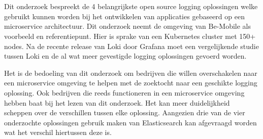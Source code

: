 
%
%




\chapter*{}

Dit onderzoek bespreekt de 4 belangrijkste open source logging oplossingen welke gebruikt kunnen worden bij het ontwikkelen van applicaties gebaseerd op een microservice architectuur. Dit onderzoek neemt de omgeving van Be-Mobile als voorbeeld en referentiepunt. Hier is sprake van een Kubernetes cluster met 150+ nodes. Na de recente release van Loki door Grafana moet een vergelijkende studie tussen Loki en de al wat meer gevestigde logging oplossingen gevoerd worden. 

Het is de bedoeling van dit onderzoek om bedrijven die willen overschakelen naar een microservice omgeving te helpen met de zoektocht naar een geschikte logging oplossing. Ook bedrijven die reeds functioneren in een microservice omgeving hebben baat bij het lezen van dit onderzoek. Het kan meer duidelijkheid scheppen over de verschillen tussen elke oplossing. Aangezien drie van de vier onderzochte oplossingen gebruik maken van Elasticsearch kan afgevraagd worden wat het verschil hiertussen deze is.

